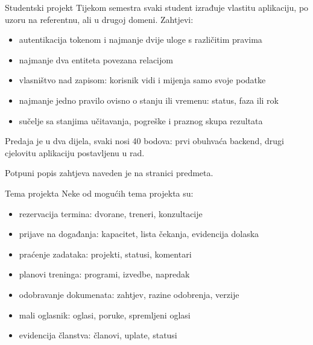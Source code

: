 
\begin{frame}{Studentski projekt}
Tijekom semestra svaki student izrađuje vlastitu aplikaciju, po uzoru na referentnu, ali u drugoj domeni. Zahtjevi:

\begin{itemize}
  \item autentikacija tokenom i najmanje dvije uloge s različitim pravima
  \item najmanje dva entiteta povezana relacijom
  \item vlasništvo nad zapisom: korisnik vidi i mijenja samo svoje podatke
  \item najmanje jedno pravilo ovisno o stanju ili vremenu: status, faza ili rok
  \item sučelje sa stanjima učitavanja, pogreške i praznog skupa rezultata
\end{itemize}

\vspace{0.4em}
Predaja je u dva dijela, svaki nosi 40 bodova: prvi obuhvaća backend, drugi cjelovitu aplikaciju postavljenu u rad.

\vspace{0.3em}
Potpuni popis zahtjeva naveden je na stranici predmeta.
\end{frame}

\begin{frame}{Tema projekta}
Neke od mogućih tema projekta su:

\begin{itemize}
  \item rezervacija termina: dvorane, treneri, konzultacije
  \item prijave na događanja: kapacitet, lista čekanja, evidencija dolaska
  \item praćenje zadataka: projekti, statusi, komentari
  \item planovi treninga: programi, izvedbe, napredak
  \item odobravanje dokumenata: zahtjev, razine odobrenja, verzije
  \item mali oglasnik: oglasi, poruke, spremljeni oglasi
  \item evidencija članstva: članovi, uplate, statusi
\end{itemize}
\end{frame}

